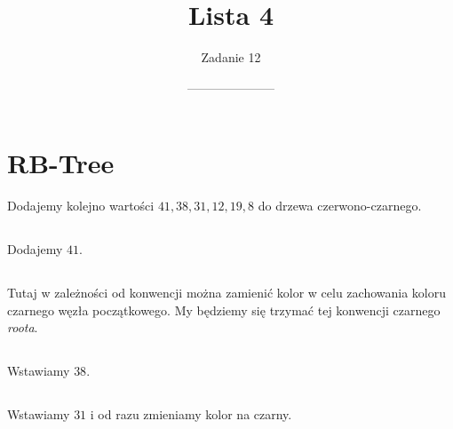 \documentclass[14pt]{article}
\title{Lista 4}
\author{Zadanie 12}
\date{---------------------}
\begin{document}
\maketitle

\section{RB-Tree}
Dodajemy kolejno wartości $41, 38, 31, 12, 19, 8$ do drzewa czerwono-czarnego.

\subsection{}
Dodajemy $41$.

\begin{center}
\end{center}

\subsection{}

Tutaj w zależności od konwencji można zamienić kolor w celu zachowania koloru czarnego węzła początkowego. My będziemy się trzymać tej konwencji czarnego \textit{roota}.

\begin{center}
\end{center}

\subsection{}
Wstawiamy $38$.

\begin{center}
\end{center}

\subsection{}
Wstawiamy $31$ i od razu zmieniamy kolor na czarny.
\end{document}
